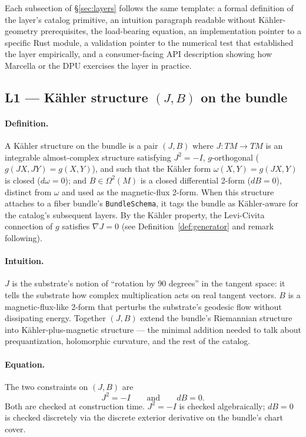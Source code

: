 \documentclass[11pt,letterpaper]{article}
\begin{document}
Each subsection of \S\ref{sec:layers} follows the same template: a
formal definition of the layer's catalog primitive, an intuition
paragraph readable without K\"ahler-geometry prerequisites, the
load-bearing equation, an implementation pointer to a specific Rust
module, a validation pointer to the numerical test that established
the layer empirically, and a consumer-facing API description showing
how Marcella or the DPU exercises the layer in practice.

\subsection{L1 --- K\"ahler structure $(J, B)$ on the bundle}

\paragraph{Definition.}
A K\"ahler structure on the bundle is a pair $(J, B)$ where
$J: TM \to TM$ is an integrable almost-complex structure satisfying
$J^2 = -I$, $g$-orthogonal ($g(JX, JY) = g(X, Y)$), and such that the
K\"ahler form $\omega(X, Y) = g(JX, Y)$ is closed ($d\omega = 0$);
and $B \in \Omega^2(M)$ is a closed differential 2-form ($dB = 0$),
distinct from $\omega$ and used as the magnetic-flux 2-form. When
this structure attaches to a fiber bundle's \texttt{BundleSchema},
it tags the bundle as K\"ahler-aware for the catalog's subsequent
layers. By the K\"ahler property, the Levi-Civita connection of $g$
satisfies $\nabla J = 0$ (see Definition~\ref{def:generator} and
remark following).

\paragraph{Intuition.}
$J$ is the substrate's notion of ``rotation by 90 degrees'' in the
tangent space: it tells the substrate how complex multiplication
acts on real tangent vectors. $B$ is a magnetic-flux-like 2-form
that perturbs the substrate's geodesic flow without dissipating
energy. Together $(J, B)$ extend the bundle's Riemannian structure
into K\"ahler-plus-magnetic structure --- the minimal addition
needed to talk about prequantization, holomorphic curvature, and
the rest of the catalog.

\paragraph{Equation.}
The two constraints on $(J, B)$ are
\[
J^2 = -I \qquad \text{and} \qquad dB = 0.
\]
Both are checked at construction time. $J^2 = -I$ is checked
algebraically; $dB = 0$ is checked discretely via the discrete
exterior derivative on the bundle's chart cover.
\end{document}
